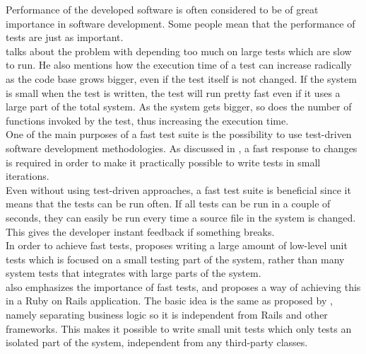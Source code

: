 \label{sec:theory_time}
Performance of the developed software is often considered to be of great
importance in software development. Some people mean that the
performance of tests are just as important.\\

\citet{video:fast_slow_test} talks about the problem with depending too
much on large tests which are slow to run. He also mentions how the
execution time of a test can increase radically as the code base grows
bigger, even if the test itself is not changed. If the system is small
when the test is written, the test will run pretty fast even if it uses
a large part of the total system. As the system gets bigger, so does the
number of functions invoked by the test, thus increasing the execution
time.\\

One of the main purposes of a fast test suite is the possibility to use
test-driven software development methodologies. As discussed in
, a fast response to changes is required in order to make
it practically possible to write tests in small iterations.\\

Even without using test-driven approaches, a fast test suite is
beneficial since it means that the tests can be run often. If all tests
can be run in a couple of seconds, they can easily be run every time a
source file in the system is changed. This gives the developer instant
feedback if something breaks.\\

In order to achieve fast tests, \citeauthor{video:fast_slow_test}
proposes writing a large amount of low-level unit tests which is focused
on a small testing part of the system, rather than many system tests
that integrates with large parts of the system.\\

\citet{video:fast_rails_tests} also emphasizes the importance of fast
tests, and proposes a way of achieving this in a Ruby on Rails
application. The basic idea is the same as proposed by
\citeauthor{video:fast_slow_test}, namely separating business logic so
it is independent from Rails and other frameworks. This makes it
possible to write small unit tests which only tests an isolated part of
the system, independent from any third-party classes.\\
